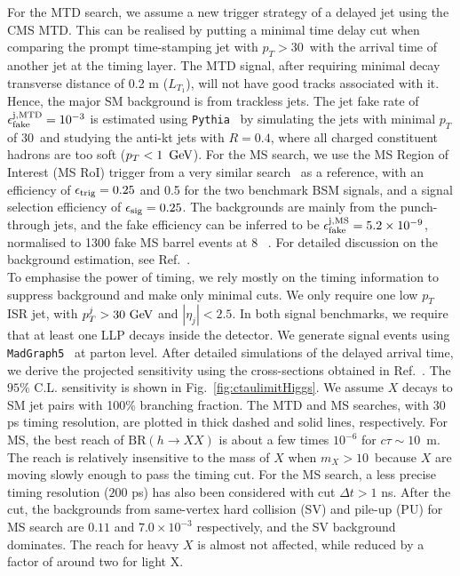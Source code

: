 For the MTD search, we assume a new trigger strategy of a delayed jet using the CMS MTD.
This can be realised by putting a minimal time delay cut when comparing the prompt time-stamping jet with $p_T > 30$~\UGeV with the arrival time of another jet at the timing layer. 
The MTD signal, after requiring minimal decay transverse distance of 0.2 m ($L_{T_1}$), will not 
have good tracks associated with it. Hence, the major SM background is from trackless jets.
The jet fake rate of $\epsilon_{\rm fake}^{\rm j, MTD} = 10^{-3}$ is estimated
using {\tt Pythia}~\cite{Sjostrand:2007gs} by simulating the jets with minimal $p_T$ of 30~\UGeV and studying the anti-kt jets with $R=0.4$, where all charged constituent hadrons are too soft ($p_T<1~\,\text{Ge\hspace{-.08em}V}$). 
For the MS search, we use the MS Region 
of Interest (MS RoI) trigger from a very similar search~\cite{Aaboud:2017iio} as a reference, with an efficiency 
of $\epsilon_{\rm trig}=0.25$ and 0.5 for the two benchmark BSM signals, and a signal selection efficiency of 
$\epsilon_{\rm sig}=0.25$. The backgrounds are mainly from the punch-through jets, and the  fake efficiency can be inferred 
to be $\epsilon_{\rm fake}^{\rm j, MS} = 5.2 \times 10^{-9}$, normalised to 1300 fake MS barrel events at 8 \UTeV~\cite{Aaboud:2017iio}.
For detailed discussion on the background estimation, see Ref.~\cite{Liu:2018wte}.
\\

To emphasise the power of timing, we rely mostly on the timing information to suppress background and make only 
minimal cuts. We only require one low $p_T$ ISR jet, with $p_T^j > 30~\text{\ensuremath{\text{GeV}}}$ and $|\eta_j| < 2.5$.
In both signal benchmarks, we require that at least one LLP decays inside the detector. We generate signal events using {\tt MadGraph5}~\cite{Alwall:2014hca} at parton level. 
After detailed simulations of the delayed arrival time, we derive the projected sensitivity using the 
cross-sections obtained in Ref.~\cite{Greiner:2015jha}. The $95\%$ C.L. sensitivity is shown in Fig.~\ref{fig:ctaulimitHiggs}. 
We assume $X$ decays to SM jet pairs with 100\% branching fraction.
The MTD and MS searches, with $30$ ps timing resolution, are plotted in thick dashed and solid lines, respectively. 
For MS, the best reach of $\text{BR}(h\to XX)$ is about a few times $10^{-6}$ for $c \tau \sim 10$~m. 
The reach is relatively insensitive to the mass of $X$ when $m_X> 10$~\UGeV because $X$ are moving slowly enough
to pass the timing cut. 
For the MS search, a less precise timing resolution 
($200$ ps) has also been considered with cut $\Delta t > 1$ ns. After the cut, the backgrounds from same-vertex hard collision (SV) and pile-up (PU) for MS search are $0.11$ and $7.0 \times 10^{-3}$ respectively, and the SV background dominates.  
The reach for heavy $X$ is almost not affected, 
while reduced by a factor of around two for light X.

